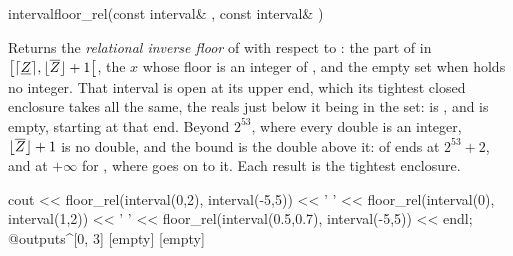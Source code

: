 \begin{deffun}{interval}{floor\_rel}{(const interval\& , const interval\& )}
  \begin{operation}
  \end{operation}
  Returns the \emph{relational inverse floor} of  with respect to
  : the part of  in
  $\left[\lceil\underline{Z}\rceil,\lfloor\overline{Z}\rfloor+1\right[$,
  the $x$ whose floor is an integer of , and the empty set when
   holds no integer. That interval is open at its upper end, which
  its tightest closed enclosure takes all the same, the reals just below it
  being in the set:  is
  , and  is empty,
   starting at that end. Beyond $2^{53}$, where every double is an
  integer, $\lfloor\overline{Z}\rfloor+1$ is no double, and the bound is
  the double above it:  of  ends at
  $2^{53}+2$, and at $+\infty$ for ,
  where  goes on to it. Each result is the tightest
  enclosure.\newinvfive
\begin{example}
cout << floor_rel(interval(0,2), interval(-5,5)) << ' '
     << floor_rel(interval(0), interval(1,2)) << ' '
     << floor_rel(interval(0.5,0.7), interval(-5,5)) << endl;
@outputs^[0, 3] [empty] [empty]~
\end{example}
\end{deffun}


